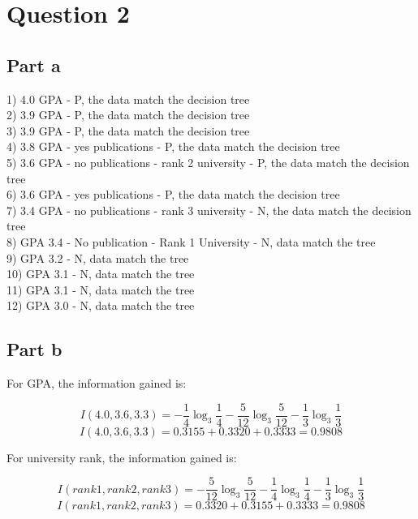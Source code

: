 \documentclass[12pt]{article}
\begin{document}
\section*{Question 2}

\subsection*{Part a}

1) 4.0 GPA - P, the data match the decision tree\\
2) 3.9 GPA - P, the data match the decision tree\\
3) 3.9 GPA - P, the data match the decision tree\\
4) 3.8 GPA - yes publications - P, the data match the decision tree\\
5) 3.6 GPA - no publications - rank 2 university - P, the data match the decision tree\\
6) 3.6 GPA - yes publications - P, the data match the decision tree\\
7) 3.4 GPA - no publications - rank 3 university - N, the data match the decision tree\\
8) GPA 3.4 - No publication - Rank 1 University - N, data match the tree\\
9) GPA 3.2 - N, data match the tree\\
10) GPA 3.1 - N, data match the tree\\
11) GPA 3.1 - N, data match the tree\\
12) GPA 3.0 - N, data match the tree\\

\subsection*{Part b}

For GPA, the information gained is:

\begin{equation}
I(4.0, 3.6, 3.3) = -\frac{1}{4}\log_3\frac{1}{4} -\frac{5}{12}\log_3\frac{5}{12} -\frac{1}{3}\log_3\frac{1}{3}
\end{equation}
\begin{equation}
I(4.0, 3.6, 3.3) = 0.3155 + 0.3320 + 0.3333 = 0.9808
\end{equation}

For university rank, the information gained is:

\begin{equation}
I(rank 1, rank 2, rank 3) = -\frac{5}{12}\log_3\frac{5}{12} -\frac{1}{4}\log_3\frac{1}{4} -\frac{1}{3}\log_3\frac{1}{3}
\end{equation}
\begin{equation}
I(rank 1, rank 2, rank 3) = 0.3320 + 0.3155 + 0.3333 = 0.9808
\end{equation}
\end{document}
